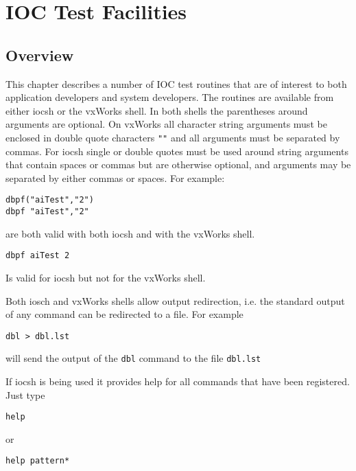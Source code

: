 \chapter{IOC Test Facilities}

\section{Overview}

This chapter describes a number of IOC test routines that are of interest to both application developers and system 
developers. The routines are available from either iocsh or the vxWorks shell. In both shells the parentheses around 
arguments are optional. On vxWorks all character string arguments must be enclosed in double quote characters \verb|""| and 
all arguments must be separated by commas. For iocsh single or double quotes must be used around string arguments that 
contain spaces or commas but are otherwise optional, and arguments may be separated by either commas or spaces. For 
example:

\begin{verbatim}
dbpf("aiTest","2")
dbpf "aiTest","2"
\end{verbatim}

are both valid with both iocsh and with the vxWorks shell.

\begin{verbatim}
dbpf aiTest 2
\end{verbatim}

Is valid for iocsh but not for the vxWorks shell.

Both iosch and vxWorks shells allow output redirection, i.e. the standard output of any command can be redirected to a 
file. For example

\begin{verbatim}
dbl > dbl.lst
\end{verbatim}

will send the output of the \verb|dbl| command to the file \verb|dbl.lst|

If iocsh is being used it provides help for all commands that have been registered. Just type

\begin{verbatim}
help
\end{verbatim}

or

\begin{verbatim}
help pattern*
\end{verbatim}

